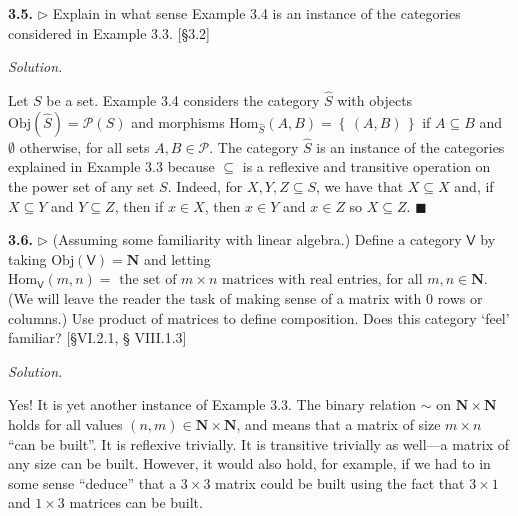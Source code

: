 \documentclass[14pt,parskip=full]{scrartcl}
\newcommand{\exercise}[3]{
\noindent
\textbf{#1.} #2

\noindent
\textit{Solution.}{\let\tpar\par \let\par\relax #3}
}
\newcommand{\set}[1]{\left\{\,#1\,\right\}}
\newcommand*{\QEDA}{\hfill\ensuremath{\blacksquare}}
\newcommand{\Obj}{\mathrm{Obj}}
\newcommand{\Hom}{\mathrm{Hom}}
\begin{document}
\exercise
{3.5}{$\rhd$ Explain in what sense Example 3.4 is an instance of the categories
considered in Example 3.3. [\S 3.2]}{

Let $S$ be a set. Example 3.4 considers the category $\hat{S}$ with objects
$\Obj(\hat{S}) = \mathscr{P}(S)$ and morphisms $\Hom_{\hat{S}}(A,B) =
\set{(A,B)}$ if $A\subseteq B$ and $\emptyset$ otherwise, for all sets
$A,B\in\mathscr{P}$. The category $\hat{S}$ is an instance of the categories
explained in Example 3.3 because $\subseteq$ is a reflexive and transitive
operation on the power set of any set $S$. Indeed, for $X,Y,Z\subseteq S$, we have
that $X\subseteq X$ and, if $X\subseteq Y$ and $Y\subseteq Z$, then if $x\in X$,
then $x\in Y$ and $x\in Z$ so $X\subseteq Z$.
\QEDA

}

\exercise
{3.6}{$\rhd$ (Assuming some familiarity with linear algebra.) Define a category
$\mathsf{V}$ by taking $\Obj(\mathsf{V}) = \mathbf{N}$ and letting
$\Hom_{\mathsf{V}}(m,n) = \text{ the set of $m\times n$ matrices with real
entries,}$ for all $m,n\in\mathbf{N}$. (We will leave the reader the task of
making sense of a matrix with 0 rows or columns.) Use product of matrices to
define composition. Does this category `feel' familiar? [\S VI.2.1, \S
VIII.1.3]}{

Yes! It is yet another instance of Example 3.3. The binary relation $\sim$ on
$\mathbf{N} \times \mathbf{N}$ holds for all values $(n,m)\in\mathbf{N} \times
\mathbf{N}$, and means that a matrix of size $m\times n$ ``can be built''. It is
reflexive trivially. It is transitive trivially as well---a matrix of any size
can be built. However, it would also hold, for example, if we had to in some
sense ``deduce'' that a $3\times 3$ matrix could be built using the fact that
$3\times 1$ and $1\times 3$ matrices can be built.

}
\end{document}
